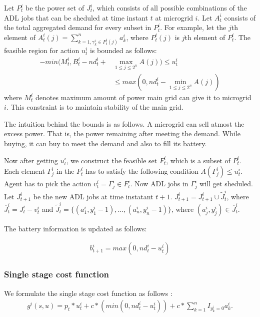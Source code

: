 Let $P_{t}^{i}$ be the power set of $J_{t}^{i}$, which consists of all possible combinations of the ADL jobs that can be sheduled at time instant $t$ at microgrid $i$. Let  $A_{t}^{i}$ consists of the total aggregated demand  for every subset in  $P_{t}^{i}$. For example, let the $j$th element of $A_{t}^{i}(j) = \sum_{k=1, \gamma_k^i \in P_{t}^{i}(j) }^n a_k^i$, where $ P_{t}^{i}(j)$ is $j$th element of  $P_{t}^{i}$.
 The feasible region for action $u_{t}^{i}$ is bounded as follows:
\begin{align}
-min(M_t^i, B_t^i - nd_t^i + &\max_{1\leq j \leq 2^n} A(j) ) \leq u_t^i \nonumber\\ &\leq max(0, nd_t^i - \min_{1\leq j \leq 2^n} A(j))
\end{align}
where $M_t^i$ denotes maximum amount of power main grid can give it to microgrid $i$. This constraint is to maintain stability of the main grid. 

The intuition behind the bounds is as follows. A microgrid can sell atmost the excess power. That is, the power remaining after meeting the demand. While buying, it can buy to meet the demand and also to fill its battery.

Now after getting $u_{t}^{i}$, we construct the feasible set $F_{t}^{i}$, which is a subset of $P_{t}^{i}$. Each element $\Gamma_{j}^{i}$ in the $F_{t}^{i}$ has to satisfy the following condition $A(\Gamma_{j}^{i}) \leq u_{t}^{i} $.
Agent has to pick the action $v_{t}^{i} = \Gamma_{j}^{i} \in F_{t}^{i}$. Now ADL jobs in $\Gamma_{j}^{i}$ will get sheduled. Let $J_{t+1}^{i}$ be the new ADL jobs at time instatant $t+1$. $J_{t+1}^{i} = J_{t+1}^{i} \cup \widetilde J_{t}^{i}$, where $\overline J_{t}^{i} = J_{t}^{i} - v_{t}^{i}$ and $\widetilde J_{t}^{i} =  \{(a_{1}^{i}, y_{1}^{i} - 1),\ldots,(a_{n}^{i}, y_{n}^{i} - 1)\}$, where $ (a_{j}^{i}, y_{j}^{i}) \in \overline J_{t}^{i}$.

The battery information is updated as follows:

\begin{align}
b_{t+1}^{i} = max(0,nd_{t}^{i} - u_{t}^{i})
\end{align}
\subsubsection{Single stage cost function}
We formulate the single stage cost function as follows :
\begin{align}
g^{i}(s,u) = p_{t}*u_{t}^{i} + c*(min(0,nd_{t}^{i} - u_{t}^{i})) + c* \sum_{k =1}^{n} I_{y_{k}^{i} = 0} a_{k}^{i}.
\end{align}

